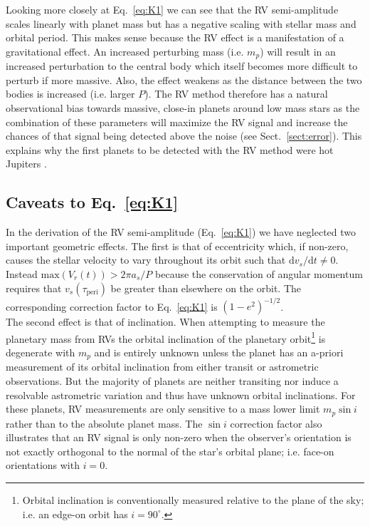 Looking more closely at Eq.~\ref{eq:K1} we can see that the RV semi-amplitude scales 
linearly with planet mass but has a negative scaling with stellar mass and orbital 
period. This makes sense because the RV effect is a manifestation of a gravitational effect.
An increased perturbing mass (i.e. $m_p$) will result in an increased perturbation to the 
central body which itself becomes more difficult to perturb if more massive. Also, the 
effect weakens as the distance between the two bodies is increased (i.e. larger $P$). The 
RV method therefore has a natural observational bias towards massive, 
close-in planets around low mass stars as the combination of these parameters will maximize the
RV signal and increase the chances of that signal being detected above the noise (see
Sect.~\ref{sect:error}). This explains why the first planets to be detected with the
RV method were hot Jupiters \citep[e.g.][]{mayor95}.

\subsection{Caveats to Eq.~\ref{eq:K1}}
In the derivation of the RV semi-amplitude (Eq.~\ref{eq:K1}) we have neglected two 
important geometric effects. The first is that of eccentricity which, if non-zero, 
causes the stellar velocity to vary throughout its orbit such that
$\text{d}v_s/\text{d}t \ne 0$. Instead $\mathrm{max}(V_r(t)) > 2\pi a_s/P$ 
because the conservation of angular momentum requires that $v_s(\tau_{\text{peri}})$ 
be greater than elsewhere on the orbit. The corresponding correction 
factor to Eq.~\ref{eq:K1} is $(1-e^2)^{-1/2}$. \\

The second effect is that of inclination. When attempting to measure the planetary 
mass from RVs the orbital inclination of the planetary orbit\footnote{Orbital 
inclination is conventionally measured  relative 
to the plane of the sky; i.e. an edge-on orbit has $i=90^{\circ}$.} is degenerate with
$m_p$ and is entirely unknown unless the planet has an a-priori measurement of its orbital
inclination from either transit or astrometric observations. But the majority of planets are
neither transiting nor induce a resolvable astrometric variation and thus have unknown
orbital inclinations. For these planets, RV measurements 
are only sensitive to a mass lower limit $m_p\sin{i}$ rather than to the absolute planet mass.
The $\sin{i}$ correction factor also illustrates that an RV signal is only non-zero when
the observer's orientation is not exactly orthogonal to the normal of the star's orbital plane;
i.e. face-on orientations with $i=0$. \\

